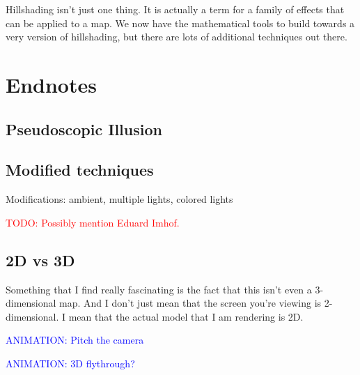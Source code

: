 \documentclass{article}
\newcommand\todo[1]{\textcolor{red}{TODO: #1}}
\newcommand\animation[1]{\textcolor{blue}{ANIMATION: #1}}
\begin{document}
Hillshading isn't just one thing.
It is actually a term for a family of effects that can be applied to a map.
We now have the mathematical tools to build towards a very version of hillshading, but there are lots of additional techniques out there.

\section{Endnotes}

\subsection{Pseudoscopic Illusion}

\subsection{Modified techniques}

Modifications: ambient, multiple lights, colored lights

\todo{Possibly mention Eduard Imhof.}

\subsection{2D vs 3D}

Something that I find really fascinating is the fact that this isn't even a 3-dimensional map.
And I don't just mean that the screen you're viewing is 2-dimensional.
I mean that the actual model that I am rendering is 2D.

\animation{Pitch the camera}

\animation{3D flythrough?}
\end{document}
